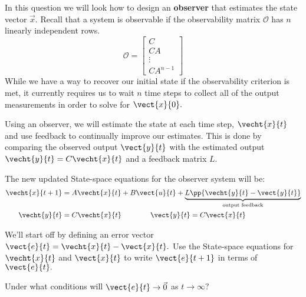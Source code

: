 
In this question we will look how to design an \textbf{observer} that estimates the state vector $\vec{x}.$ 
Recall that a system is observable if the observability matrix $\mathcal{O}$ has $n$ linearly independent rows.
\begin{equation}
 \mathcal{O} = \begin{bmatrix} C \\ CA \\ \vdots \\ CA^{n-1} \end{bmatrix}
\end{equation}
While we have a way to recover our initial state if the observability criterion is met, it currently requires us to wait $n$ time steps to collect all of the output measurements in order to solve for $\vect{x}{0}.$

Using an observer, we will estimate the state at each time step, $\vecht{x}{t}$ and use feedback to continually improve our estimates.
This is done by comparing the observed output $\vect{y}{t}$ with the estimated output $\vecht{y}{t} = C \vecht{x}{t}$ and a feedback matrix $L.$

The new updated State-space equations for the observer system will be:
\begin{align*}
  \vecht{x}{t+1} & = A \vecht{x}{t} + B \vect{u}{t} + \underbrace{ L \pp{ \vecht{y}{t} - \vect{y}{t}   }}_{\text{output feedback} } \\
  \vecht{y}{t} &= C \vecht{x}{t} \qquad \qquad \vect{y}{t} = C \vect{x}{t}
\end{align*}

\begin{enumerate}
  \qitem We'll start off by defining an error vector $\vect{e}{t} = \vecht{x}{t} - \vect{x}{t}.$ Use the State-space equations for $\vecht{x}{t}$ and $\vect{x}{t}$ to write $\vect{e}{t + 1}$ in terms of $\vect{e}{t}.$


  \qitem Under what conditions will $\vect{e}{t} \to \vec{0}$ as $t \to \infty?$ 

\end{enumerate}

